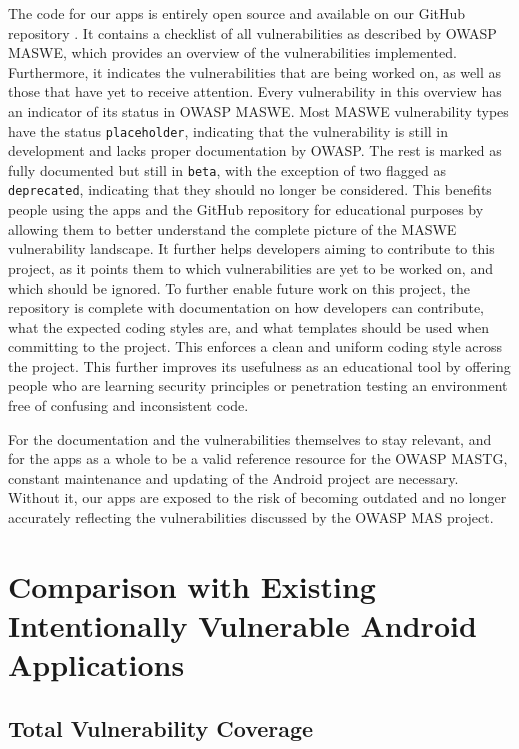 The code for our apps is entirely open source and available on our GitHub repository \cite{ba_thesis_github_repository}. It contains a checklist \cite{ba_thesis_github_repository_checklist} of all vulnerabilities as described by OWASP MASWE, which provides an overview of the vulnerabilities implemented. Furthermore, it indicates the vulnerabilities that are being worked on, as well as those that have yet to receive attention. Every vulnerability in this overview has an indicator of its status in OWASP MASWE. Most MASWE vulnerability types have the status \texttt{placeholder}, indicating that the vulnerability is still in development and lacks proper documentation by OWASP. The rest is marked as fully documented but still in \texttt{beta}, with the exception of two flagged as \texttt{deprecated}, indicating that they should no longer be considered. This benefits people using the apps and the GitHub repository for educational purposes by allowing them to better understand the complete picture of the MASWE vulnerability landscape. It further helps developers aiming to contribute to this project, as it points them to which vulnerabilities are yet to be worked on, and which should be ignored. To further enable future work on this project, the repository is complete with documentation on how developers can contribute, what the expected coding styles are, and what templates should be used when committing to the project. This enforces a clean and uniform coding style across the project. This further improves its usefulness as an educational tool by offering people who are learning security principles or penetration testing an environment free of confusing and inconsistent code.

For the documentation and the vulnerabilities themselves to stay relevant, and for the apps as a whole to be a valid reference resource for the OWASP MASTG, constant maintenance and updating of the Android project are necessary. Without it, our apps are exposed to the risk of becoming outdated and no longer accurately reflecting the vulnerabilities discussed by the OWASP MAS project.

\section{Comparison with Existing Intentionally Vulnerable Android Applications}

\subsection{Total Vulnerability Coverage}

